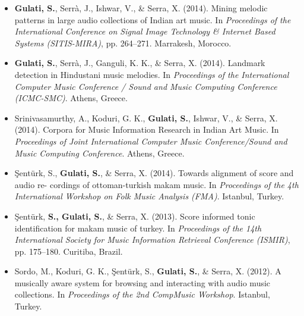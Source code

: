 \begin{itemize}[leftmargin=*]
	\item \textbf{Gulati, S.},  Serr{\`a}, J., Ishwar, V., \& Serra, X. (2014). Mining melodic patterns in large audio collections of Indian art music. In \textit{Proceedings of the International Conference on Signal Image Technology \& Internet Based Systems (SITIS-MIRA)}, pp. 264–271. Marrakesh, Morocco.
	\item \textbf{Gulati, S.}, Serr{\`a}, J., Ganguli, K. K., \& Serra, X. (2014). Landmark detection in Hindustani music melodies. In \textit{Proceedings of the International Computer Music Conference / Sound and Music Computing Conference (ICMC-SMC)}. Athens, Greece. 
	\item Srinivasamurthy, A., Koduri, G. K., \textbf{Gulati, S.}, Ishwar, V., \& Serra, X. (2014). Corpora for Music Information Research in Indian Art Music. In \textit{Proceedings of Joint International Computer Music Conference/Sound and Music Computing Conference}. Athens, Greece. 
	\item \c{S}ent{\"u}rk, S., \textbf{Gulati, S.}, \& Serra, X. (2014). Towards alignment of score and audio re- cordings of ottoman-turkish makam music. In \textit{Proceedings of the 4th International Workshop on Folk Music Analysis (FMA)}. Istanbul, Turkey. 
	\item \c{S}ent{\"u}rk, \textbf{S., Gulati, S.}, \& Serra, X. (2013). Score informed tonic identification for makam music of turkey. In \textit{Proceedings of the 14th International Society for Music Information Retrieval Conference (ISMIR)}, pp. 175–180. Curitiba, Brazil.
	\item Sordo, M., Koduri, G. K., \c{S}ent{\"u}rk, S., \textbf{Gulati, S.}, \& Serra, X. (2012). A musically aware system for browsing and interacting with audio music collections. In \textit{Proceedings of the 2nd CompMusic Workshop}. Istanbul, Turkey.
	
	




\end{itemize}
